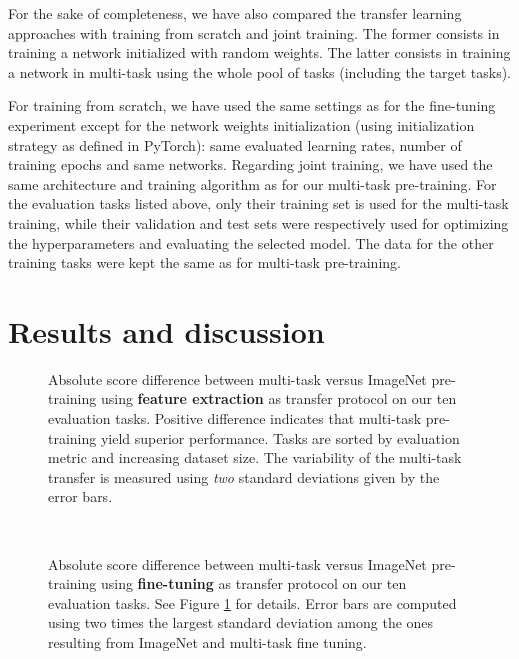 For the sake of completeness, we have also compared the transfer learning approaches with training from scratch and joint training. The former consists in training a network initialized with random weights. The latter consists in training a network in multi-task using the whole pool of tasks (including the target tasks). 

For training from scratch, we have used the same settings as for the fine-tuning experiment except for the network weights initialization (using initialization strategy as defined in PyTorch): same evaluated learning rates, number of training epochs and same networks. Regarding joint training, we have used the same architecture and training algorithm as for our multi-task pre-training. For the evaluation tasks listed above, only their training set is used for the multi-task training, while their validation and test sets were respectively used for optimizing the hyperparameters and evaluating the selected model. The data for the other training tasks were kept the same as for multi-task pre-training.

\section{Results and discussion}
\label{sec:mtask:results}
\begin{figure}[t]
    \center
    \caption{Absolute score difference between multi-task versus ImageNet pre-training using \textbf{feature extraction} as transfer protocol on our ten evaluation tasks. Positive difference indicates that multi-task pre-training yield superior performance. Tasks are sorted by evaluation metric and increasing dataset size. The variability of the multi-task transfer is measured using \textit{two} standard deviations given by the error bars.}  
    \label{fig:mtask:res_featext}
\end{figure}

\begin{figure}[t]
    \centering
    \\
    \caption{Absolute score difference between multi-task versus ImageNet pre-training using \textbf{fine-tuning} as transfer protocol on our ten evaluation tasks. See Figure \ref{fig:mtask:res_featext} for details. Error bars are computed using two times the largest standard deviation among the ones resulting from ImageNet and multi-task fine tuning.}  
    \label{fig:mtask:res_finetune}
\end{figure}

